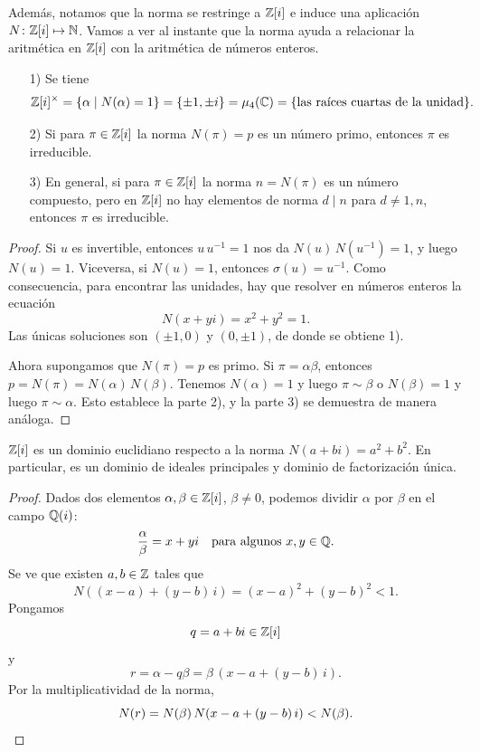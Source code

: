 Además, notamos que la norma se restringe a $\mathbb{Z} [i]$ e induce una aplicación
$N\colon \mathbb{Z} [i] \mapsto \mathbb{N}$. Vamos a ver al instante que la norma ayuda a
relacionar la aritmética en $\mathbb{Z} [i]$ con la aritmética de números enteros.

\begin{lema}
  \begin{enumerate}
  \item[1)] Se tiene
    \[ \mathbb{Z} [i]^\times = \{ \alpha \mid N (\alpha) = 1 \}
           = \{ \pm 1, \pm i \}
           = \mu_4 (\mathbb{C})
           = \{ \text{las raíces cuartas de la unidad} \}. \]

  \item[2)] Si para $\pi \in \mathbb{Z} [i]$ la norma $N (\pi) = p$ es un número primo,
    entonces $\pi$ es irreducible.

  \item[3)] En general, si para $\pi \in \mathbb{Z} [i]$ la norma $n = N (\pi)$ es
    un número compuesto, pero en $\mathbb{Z} [i]$ no hay elementos de norma $d \mid n$
    para $d \ne 1, n$, entonces $\pi$ es irreducible.
  \end{enumerate}

  \begin{proof}
    Si $u$ es invertible, entonces $u\,u^{-1} = 1$ nos da
    $N (u)\,N (u^{-1}) = 1$, y luego $N (u) = 1$. Viceversa, si $N (u) = 1$,
    entonces $\sigma (u) = u^{-1}$. Como consecuencia, para encontrar las
    unidades, hay que resolver en números enteros la ecuación
    $$N (x + yi) = x^2 + y^2 = 1.$$
    Las únicas soluciones son $(\pm 1, 0)$ y $(0, \pm 1)$,
    de donde se obtiene 1).

    Ahora supongamos que $N (\pi) = p$ es primo. Si $\pi = \alpha\beta$,
    entonces $p = N (\pi) = N (\alpha)\,N (\beta)$. Tenemos $N (\alpha) = 1$
    y luego $\pi \sim \beta$ o $N (\beta) = 1$ y luego $\pi \sim \alpha$.
    Esto establece la parte 2), y la parte 3) se demuestra de manera análoga.
  \end{proof}
\end{lema}

\begin{lema}
  $\mathbb{Z} [i]$ es un dominio euclidiano respecto a la norma
  $N (a + bi) = a^2 + b^2$. En particular, es un dominio de ideales principales
  y dominio de factorización única.

  \begin{proof}
    Dados dos elementos $\alpha,\beta \in \mathbb{Z} [i]$, $\beta \ne 0$, podemos
    dividir $\alpha$ por $\beta$ en el campo $\mathbb{Q} (i)$:
    $$\frac{\alpha}{\beta} = x + yi \quad \text{para algunos }x,y\in \mathbb{Q}.$$
    Se ve que existen $a,b\in\mathbb{Z}$ tales que
    $$N ((x-a) + (y-b)\,i) = (x-a)^2 + (y-b)^2 < 1.$$
    Pongamos
    $$q = a + bi \in \mathbb{Z} [i]$$
    y
    $$r = \alpha - q\beta = \beta\,(x-a + (y-b)\,i).$$
    Por la multiplicatividad de la norma,
    \[ N (r) = N (\beta)\,N (x - a + (y-b)\,i) < N (\beta). \qedhere \]
  \end{proof}
\end{lema}

